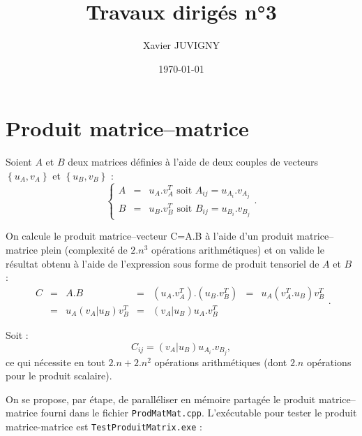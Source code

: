 \documentclass[11pt,a4paper]{article}
\author{Xavier JUVIGNY}
\date{\today}
\title{Travaux dirigés n°3}
\begin{document}
\maketitle
\tableofcontents

\section{Produit matrice--matrice}

Soient $A$ et $B$ deux matrices définies à l'aide de deux couples de vecteurs $\left\{u_{A},v_{A}\right\}$ et 
$\left\{u_{B},v_{B}\right\}$ :
\[
\left\{
	\begin{array}{lcl}
	A & = & u_{A}.v_{A}^{T}\mbox{ soit } A_{ij} = u_{A_{i}}.v_{A_{j}} \\
	B & = & u_{B}.v_{B}^{T}\mbox{ soit } B_{ij} = u_{B_{i}}.v_{B_{j}}
    \end{array}
\right..
\]

On calcule le produit matrice--vecteur C=A.B à l'aide d'un produit matrice--matrice plein (complexité de $2.n^{3}$ opérations arithmétiques)
et on valide le résultat obtenu à l'aide de l'expression sous forme de produit tensoriel de $A$ et $B$ :
\[
\begin{array}{lclclcl}
C & = & A.B & = & \left(u_{A}.v_{A}^{T}\right).\left(u_{B}.v_{B}^{T}\right) & = &  u_{A}\left(v_{A}^{T}.u_{B}\right)v_{B}^{T}\\
 &=& u_{A}\left(v_{A}|u_{B}\right)v_{B}^{T} & = & \left(v_{A}|u_{B}\right)u_{A}.v_{B}^{T}
 \end{array}.
\]

Soit :
\[
C_{ij} = \left(v_{A}|u_{B}\right)u_{A_{i}}.v_{B_{j}},
\]
ce qui nécessite en tout $2.n+2.n^{2}$ opérations arithmétiques (dont $2.n$ opérations pour le produit scalaire).

On se propose, par étape, de paralléliser en mémoire partagée le produit matrice--matrice fourni dans le fichier \texttt{ProdMatMat.cpp}. 
L'exécutable pour tester le produit matrice-matrice est \texttt{TestProduitMatrix.exe} :
\end{document}
